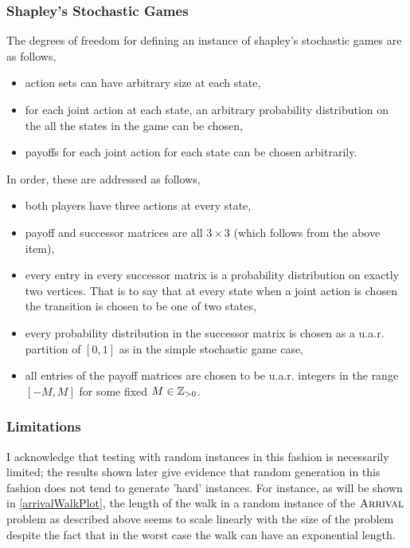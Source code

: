 \subsubsection{Shapley's Stochastic Games} \label{shapleyRandom}
The degrees of freedom for defining an instance of shapley's stochastic games are as follows,
\begin{itemize}
  \item action sets can have arbitrary size at each state,
  \item for each joint action at each state, an arbitrary probability distribution on the all
    the states in the game can be chosen,
  \item payoffs for each joint action for each state can be chosen arbitrarily.
\end{itemize}
In order, these are addressed as follows,
\begin{itemize}
  \item both players have three actions at every state,
  \item payoff and successor matrices are all $3 \times 3$ (which follows from the above item),
  \item every entry in every successor matrix is a probability distribution on exactly two vertices.
    That is to say that at every state when a joint action is chosen the transition is chosen
    to be one of two states,
  \item every probability distribution in the successor matrix is chosen as a u.a.r. partition of $[0, 1]$
    as in the simple stochastic game case,
  \item all entries of the payoff matrices are chosen to be u.a.r. integers in the range $[-M, M]$ for some
    fixed $M \in \mathbb{Z}_{> 0}$.
\end{itemize}
\subsubsection{Limitations}
I acknowledge that testing with random instances in this fashion is necessarily limited; the results
shown later give evidence that random generation in this fashion does not tend to generate 'hard' instances.
For instance, as will be shown in \cref{arrivalWalkPlot}, the length of the walk in a random instance
of the $\textsc{Arrival}$ problem as described above seems to scale linearly with the size of the problem despite
the fact that in the worst case the walk can have an exponential length.
